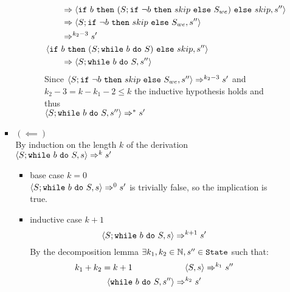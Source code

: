 \begin{exercise}
\begin{enumerate}
\begin{itemize}
\begin{itemize}
\begin{itemize}
\begin{itemize}
\begin{align*}
                                            \\&\qquad\Rightarrow \left<\texttt{if}\ b\ \texttt{then}\ (S; \texttt{if}\ \neg b\ \texttt{then}\ skip\ \texttt{else}\ S_{we})\ \texttt{else}\ skip, s''\right>
                                            \\&\qquad\Rightarrow \left<S; \texttt{if}\ \neg b\ \texttt{then}\ skip\ \texttt{else}\ S_{we}, s''\right>
                                            \\&\qquad\Rightarrow^{k_2 - 3} s'
                                            \\
                                            &\left<\texttt{if}\ b\ \texttt{then}\ (S; \texttt{while}\ b\ \texttt{do}\ S)\ \texttt{else}\ skip, s''\right>
                                            \\&\qquad\Rightarrow \left<S; \texttt{while}\ b\ \texttt{do}\ S, s''\right>
                                        \end{align*}
                                        Since $\left<S; \texttt{if}\ \neg b\ \texttt{then}\ skip\ \texttt{else}\ S_{we}, s''\right> \Rightarrow^{k_2 - 3} s'$ and $k_2 - 3 = k - k_1 - 2 \leq k$ the inductive hypothesis holds and thus \\ $\left<S; \texttt{while}\ b\ \texttt{do}\ S, s''\right> \Rightarrow^* s'$
                                    \end{itemize}
                            \end{itemize}
                        \item $(\impliedby)$ \vspace{0.2cm} \\
                            By induction on the length $k$ of the derivation $\left<S; \texttt{while}\ b\ \texttt{do}\ S, s\right> \Rightarrow^k s'$
                            \begin{itemize}
                                \item base case $k=0$ \\
                                    $\left<S; \texttt{while}\ b\ \texttt{do}\ S, s\right> \Rightarrow^0 s'$ is trivially false, so the implication is true.
                                \item inductive case $k+1$ \vspace*{-0.3cm}
                                    \[ \left<S; \texttt{while}\ b\ \texttt{do}\ S, s\right> \Rightarrow^{k+1} s' \]
                                    By the decomposition lemma $\exists k_1, k_2 \in \mathbb{N}, s'' \in \texttt{State}$ such that:
                                    \begin{gather*}
                                        k_1 + k_2 = k + 1 \qquad\qquad\qquad \instr{S}{s} \Rightarrow^{k_1} s'' \\
                                        \instr{\wwhile{b}{S}}{s''} \Rightarrow^{k_2} s'

\end{gather*}
\end{itemize}
\end{itemize}
\end{itemize}
\end{enumerate}
\end{exercise}

